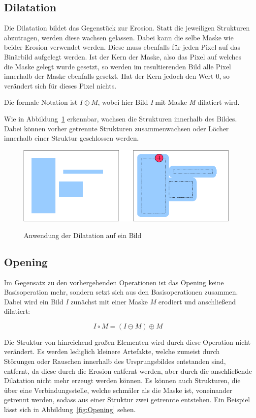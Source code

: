 \subsection{Dilatation}
Die Dilatation bildet das Gegenstück zur Erosion. Statt die jeweiligen Strukturen abzutragen, werden diese wachsen gelassen.
Dabei kann die selbe Maske wie beider Erosion verwendet werden. Diese muss ebenfalls für jeden Pixel auf das Binärbild aufgelegt werden. Ist der Kern der Maske, also das Pixel auf welches die Maske gelegt wurde gesetzt, so werden im resultierenden Bild alle Pixel innerhalb der Maske ebenfalls gesetzt. Hat der Kern jedoch den
Wert 0, so verändert sich für dieses Pixel nichts.

Die formale Notation ist $ I \oplus M $, wobei hier Bild {\em I} mit Maske {\em M} dilatiert wird.

Wie in Abbildung~\ref{fig:Dilation} erkennbar, wachsen die Strukturen innerhalb des Bildes. Dabei können vorher getrennte Strukturen zusammenwachsen oder Löcher innerhalb einer Struktur geschlossen werden.

\begin{figure}[ht]
   \centering
     \includegraphics[width=11cm]{Bilder/MorphologicalDilation} \\
 \caption{Anwendung der Dilatation auf ein Bild}
 \label{fig:Dilation}
\end{figure}

\subsection{Opening}
Im Gegensatz zu den vorhergehenden Operationen ist das Opening keine Basisoperation mehr, sondern setzt sich aus den Basisoperationen zusammen.
Dabei wird ein Bild {\em I} zunächst mit einer Maske {\em M} erodiert und anschließend dilatiert:

$$ I \circ M = ( I \ominus M ) \oplus M $$

Die Struktur von hinreichend großen Elementen wird durch diese Operation nicht verändert. Es werden lediglich kleinere Artefakte, welche zumeist durch Störungen oder Rauschen innerhalb des Ursprungsbildes entstanden sind, entfernt, da diese durch die Erosion entfernt werden, aber durch die anschließende Dilatation nicht mehr erzeugt werden können. Es können auch Strukturen, die über eine Verbindungsstelle, welche schmäler als die Maske ist, voneinander getrennt werden, sodass aus einer Struktur zwei getrennte entstehen.
Ein Beispiel lässt sich in Abbildung~\ref{fig:Opening} sehen.

